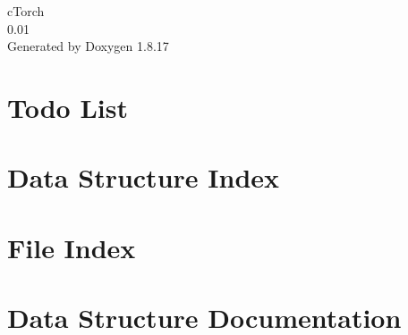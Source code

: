 \let\mypdfximage\pdfximage\def\pdfximage{\immediate\mypdfximage}\documentclass[twoside]{book}
\newcommand{\+}{\discretionary{\mbox{\scriptsize$\hookleftarrow$}}{}{}}
\newcommand{\clearemptydoublepage}{%
  \newpage{\pagestyle{empty}\cleardoublepage}%
}
\begin{document}
\hypersetup{pageanchor=false,
             bookmarksnumbered=true,
             pdfencoding=unicode
            }
\begin{titlepage}
\vspace*{7cm}
\begin{center}%
{\Large c\+Torch \\[1ex]\large 0.\+01 }\\
\vspace*{1cm}
{\large Generated by Doxygen 1.8.17}\\
\end{center}
\end{titlepage}
\clearemptydoublepage
{}
\tableofcontents
\clearemptydoublepage
{}
\hypersetup{pageanchor=true}

\chapter{Todo List}
\label{todo}

\chapter{Data Structure Index}

\chapter{File Index}

\chapter{Data Structure Documentation}



















\end{document}
